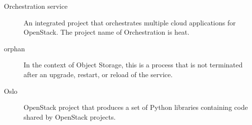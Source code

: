 \documentclass[letterpaper,10pt,english]{sphinxmanual}
\begin{document}
\begin{description}
\item[{Orchestration service}] \leavevmode{}\label{_source/glossary:term-orchestration-service}
An integrated project that orchestrates multiple cloud
applications for OpenStack. The project name of Orchestration is
heat.

\item[{orphan}] \leavevmode{}\label{_source/glossary:term-orphan}
In the context of Object Storage, this is a process that is not
terminated after an upgrade, restart, or reload of the service.

\item[{Oslo}] \leavevmode{}\label{_source/glossary:term-oslo}
OpenStack project that produces a set of Python libraries
containing code shared by OpenStack projects.

\end{description}
\end{document}
